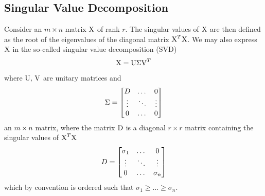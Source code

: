 \documentclass[reprint, english, nofootinbib]{revtex4-2}
\begin{document}
    \subsection{Singular Value Decomposition}
        \noindent
        Consider an $m\times n$ matrix $\textup X$ of rank $r$. The singular values of $\textup X$ are then defined as the root of the eigenvalues of the diagonal matrix $\textup X^T\textup X$. We may also express $\textup X$ in the so-called singular value decomposition (SVD)
        \begin{equation}
            \textup X = \textup{U}\Sigma\textup{V}^T
        \end{equation}
        where $\textup{U, V}$ are unitary matrices and
        \begin{equation}
            \Sigma =
            \qty[
            \begin{matrix}
                D & \dots & 0 \\
                \vdots & \ddots & \vdots \\
                0 & \dots & 0
            \end{matrix}
            ]
        \end{equation}
        an $m\times n$ matrix, where the matrix $\textup D$ is a diagonal $r \times r$ matrix containing the singular values of $\textup X^T \textup X$
        \begin{equation}
            D = \qty[
            \begin{matrix}
                \sigma_1 & \dots & 0 \\
                \vdots & \ddots & \vdots \\
                0 & \dots & \sigma_n
            \end{matrix}
            ]
        \end{equation}
        which by convention is ordered such that $\sigma_1 \geq \dots \geq \sigma_n$.
\end{document}
